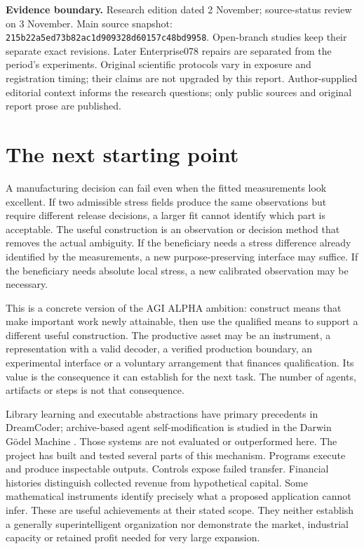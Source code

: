 \documentclass[11pt,letterpaper]{article}
\begin{document}
\textbf{Evidence boundary.} Research edition dated 2 November; source-status review on 3 November. Main source snapshot: \nolinkurl{215b22a5ed73b82ac1d909328d60157c48bd9958}. Open-branch studies keep their separate exact revisions. Later Enterprise078 repairs are separated from the period's experiments. Original scientific protocols vary in exposure and registration timing; their claims are not upgraded by this report. Author-supplied editorial context informs the research questions; only public sources and original report prose are published.

\clearpage
\section{The next starting point}
A manufacturing decision can fail even when the fitted measurements look excellent. If two admissible stress fields produce the same observations but require different release decisions, a larger fit cannot identify which part is acceptable. The useful construction is an observation or decision method that removes the actual ambiguity. If the beneficiary needs a stress difference already identified by the measurements, a new purpose-preserving interface may suffice. If the beneficiary needs absolute local stress, a new calibrated observation may be necessary.

This is a concrete version of the AGI ALPHA ambition: construct means that make important work newly attainable, then use the qualified means to support a different useful construction. The productive asset may be an instrument, a representation with a valid decoder, a verified production boundary, an experimental interface or a voluntary arrangement that finances qualification. Its value is the consequence it can establish for the next task. The number of agents, artifacts or steps is not that consequence.

Library learning and executable abstractions have primary precedents in DreamCoder; archive-based agent self-modification is studied in the Darwin G{\"o}del Machine \cite{dreamcoder,dgm}. Those systems are not evaluated or outperformed here. The project has built and tested several parts of this mechanism. Programs execute and produce inspectable outputs. Controls expose failed transfer. Financial histories distinguish collected revenue from hypothetical capital. Some mathematical instruments identify precisely what a proposed application cannot infer. These are useful achievements at their stated scope. They neither establish a generally superintelligent organization nor demonstrate the market, industrial capacity or retained profit needed for very large expansion.
\end{document}
